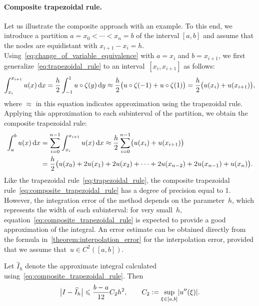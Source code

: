 \paragraph{Composite trapezoidal rule.}
Let us illustrate the composite approach with an example.
To this end,
we introduce a partition $a = x_0 < \dotsb < x_n = b$ of the interval $[a, b]$ and
assume that the nodes are equidistant with $x_{i+1} - x_i = h$.
Using~\eqref{eq:change_of_variable_equivalence} with $a = x_i$ and $b = x_{i+1}$,
we first generalize~\eqref{eq:trapezoidal_rule} to an interval~$[x_i, x_{i+1}]$ as follows:
\[
    \int_{x_i}^{x_{i+1}} u(x) \, \mathrm d x
    = \frac{h}{2} \int_{-1}^{1} u \circ \zeta (y) \, \mathrm d y
    \approx \frac{h}{2} \bigl( u \circ \zeta(-1)  + u \circ \zeta(1) \bigr)
    = \frac{h}{2} \bigl(u(x_i) + u(x_{i+1})\bigr),
\]
where $\approx$ in this equation indicates approximation using the trapezoidal rule.
Applying this approximation to each subinterval of the partition,
we obtain the composite trapezoidal rule:
\begin{align}
    \notag
    \int_{a}^{b} u(x) \, \mathrm d x
    &= \sum_{i=0}^{n-1} \int_{x_i}^{x_{i+1}} u(x) \, \mathrm d x
    \approx
    \frac{h}{2}\sum_{i=0}^{n-1} \bigl( u(x_i) + u(x_{i+1}) \bigr) \\
    \label{eq:composite_trapezoidal_rule}
    &= \frac{h}{2} \bigl( u(x_0) + 2 u(x_1) + 2 u(x_2) + \dotsb + 2 u(x_{n-2}) + 2 u(x_{n-1}) + u(x_n) \bigr).
\end{align}
Like the trapezoidal rule~\eqref{eq:trapezoidal_rule},
the composite trapezoidal rule~\eqref{eq:composite_trapezoidal_rule} has a degree of precision equal to 1.
However,
the integration error of the method depends on the parameter~$h$,
which represents the width of each subinterval:
for very small~$h$,
equation~\eqref{eq:composite_trapezoidal_rule} is expected to provide a good approximation of the integral.
An error estimate can be obtained directly from the formula in~\cref{theorem:interpolation_error} for the interpolation error,
provided that we assume that~$u \in C^2([a, b])$.

\begin{theorem}
    \label{theorem:integration_error_trapeze}
    Let $\widehat I_h$ denote the approximate integral calculated using~\eqref{eq:composite_trapezoidal_rule}.
    Then
    \begin{equation}
        \label{eq:error_bound_trapezoidal}
        \bigl\lvert I - \widehat I_h \bigr\rvert
        \leq \frac{b-a}{12} C_2 h^2,
        \qquad
        C_2 := \sup_{\xi \in [a, b]} \abs*{u''(\xi)}.
    \end{equation}
\end{theorem}

